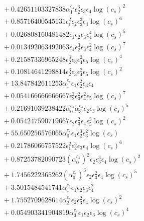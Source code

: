 \documentclass[10pt]{article}
\begin{document}
\begin{align*}
&{}  + 0.42651103327838 \alpha_{1}^{c_s} \epsilon_{2}^{3} \epsilon_{3} \epsilon_{4} \log{\left(c_{s} \right)}^{2} \\
&{}  + 0.85716400545131 \epsilon_{1}^{2} \epsilon_{2} \epsilon_{3}^{3} \epsilon_{4} \log{\left(c_{s} \right)}^{6} \\
&{}  + 0.026808160481482 \epsilon_{1} \epsilon_{2} \epsilon_{3} \epsilon_{4}^{4} \log{\left(c_{s} \right)}^{5} \\
&{}  + 0.013492063492063 \epsilon_{1} \epsilon_{2}^{3} \epsilon_{3} \epsilon_{4}^{2} \log{\left(c_{s} \right)}^{7} \\
&{}  + 0.21587336965248 \epsilon_{2}^{3} \epsilon_{3} \epsilon_{4}^{2} \epsilon_{5} \log{\left(c_{s} \right)}^{4} \\
&{}  + 0.10814641298814 \epsilon_{2}^{3} \epsilon_{3} \epsilon_{4}^{2} \epsilon_{5} \log{\left(c_{s} \right)}^{2} \\
&{}  + 13.847842611253 \alpha_{1}^{c_s} \epsilon_{1} \epsilon_{2}^{2} \epsilon_{3} \epsilon_{4} \\
&{}  + 0.054166666666667 \epsilon_{2}^{2} \epsilon_{3}^{2} \epsilon_{4}^{2} \epsilon_{5} \log{\left(c_{s} \right)}^{7} \\
&{}  + 0.21691039238422 \alpha_{0}^{c_s} \alpha_{3}^{c_s} \epsilon_{2} \epsilon_{3} \log{\left(c_{s} \right)}^{5} \\
&{}  + 0.054247590719667 \epsilon_{2} \epsilon_{3}^{2} \epsilon_{4} \epsilon_{5}^{3} \log{\left(c_{s} \right)}^{2} \\
&{}  + 55.650256576065 \alpha_{0}^{c_s} \epsilon_{1} \epsilon_{2}^{3} \epsilon_{3}^{2} \log{\left(c_{s} \right)} \\
&{}  + 0.21786066757522 \epsilon_{1}^{2} \epsilon_{2}^{3} \epsilon_{3} \epsilon_{4} \log{\left(c_{s} \right)}^{6} \\
&{}  + 0.87253782090723 \left(\alpha_{0}^{c_s}\right)^{2} \epsilon_{2} \epsilon_{3}^{3} \epsilon_{4} \log{\left(c_{s} \right)}^{2} \\
&{}  + 1.7456222365262 \left(\alpha_{0}^{c_s}\right)^{3} \epsilon_{2} \epsilon_{3}^{2} \epsilon_{4} \log{\left(c_{s} \right)}^{5} \\
&{}  + 3.5015484541741 \alpha_{1}^{c_s} \epsilon_{1} \epsilon_{2} \epsilon_{3} \epsilon_{4}^{2} \\
&{}  + 1.7552709628614 \alpha_{2}^{c_s} \epsilon_{2} \epsilon_{3}^{2} \epsilon_{4} \log{\left(c_{s} \right)}^{2} \\
&{}  + 0.054903341904819 \alpha_{3}^{c_s} \epsilon_{1} \epsilon_{2} \epsilon_{3} \log{\left(c_{s} \right)}^{4} \\

\end{align*}
\end{document}
